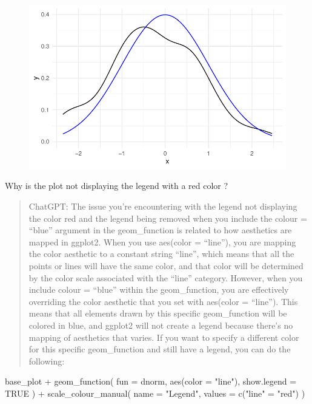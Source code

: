 \documentclass[
  letterpaper,
  DIV=11,
  numbers=noendperiod]{scrreprt}
\newenvironment{Shaded}{\begin{snugshade}}{\end{snugshade}}
\newcommand{\AttributeTok}[1]{\textcolor[rgb]{0.40,0.45,0.13}{#1}}
\newcommand{\ConstantTok}[1]{\textcolor[rgb]{0.56,0.35,0.01}{#1}}
\newcommand{\FunctionTok}[1]{\textcolor[rgb]{0.28,0.35,0.67}{#1}}
\newcommand{\NormalTok}[1]{\textcolor[rgb]{0.00,0.23,0.31}{#1}}
\newcommand{\OtherTok}[1]{\textcolor[rgb]{0.00,0.23,0.31}{#1}}
\newcommand{\SpecialCharTok}[1]{\textcolor[rgb]{0.37,0.37,0.37}{#1}}
\newcommand{\StringTok}[1]{\textcolor[rgb]{0.13,0.47,0.30}{#1}}
\begin{document}
\begin{figure}[H]

{\centering \includegraphics{./ggplot2_files/figure-pdf/unnamed-chunk-1-1.pdf}

}

\end{figure}

Why is the plot not displaying the legend with a red color ?

\begin{quote}
ChatGPT: The issue you're encountering with the legend not displaying
the color red and the legend being removed when you include the colour =
``blue'' argument in the geom\_function is related to how aesthetics are
mapped in ggplot2. When you use aes(color = ``line''), you are mapping
the color aesthetic to a constant string ``line'', which means that all
the points or lines will have the same color, and that color will be
determined by the color scale associated with the ``line'' category.
However, when you include colour = ``blue'' within the geom\_function,
you are effectively overriding the color aesthetic that you set with
aes(color = ``line''). This means that all elements drawn by this
specific geom\_function will be colored in blue, and ggplot2 will not
create a legend because there's no mapping of aesthetics that varies. If
you want to specify a different color for this specific geom\_function
and still have a legend, you can do the following:
\end{quote}

\begin{Shaded}
\begin{Highlighting}[]
\NormalTok{base\_plot }\SpecialCharTok{+} 
  \FunctionTok{geom\_function}\NormalTok{(}
    \AttributeTok{fun =}\NormalTok{ dnorm,}
    \FunctionTok{aes}\NormalTok{(}\AttributeTok{color =} \StringTok{"line"}\NormalTok{),}
    \AttributeTok{show.legend =} \ConstantTok{TRUE}
\NormalTok{  ) }\SpecialCharTok{+}
  \FunctionTok{scale\_colour\_manual}\NormalTok{(}
    \AttributeTok{name =} \StringTok{"Legend"}\NormalTok{,}
    \AttributeTok{values =} \FunctionTok{c}\NormalTok{(}\StringTok{"line"} \OtherTok{=} \StringTok{"red"}\NormalTok{)}
\NormalTok{  )}
\end{Highlighting}
\end{Shaded}
\end{document}
